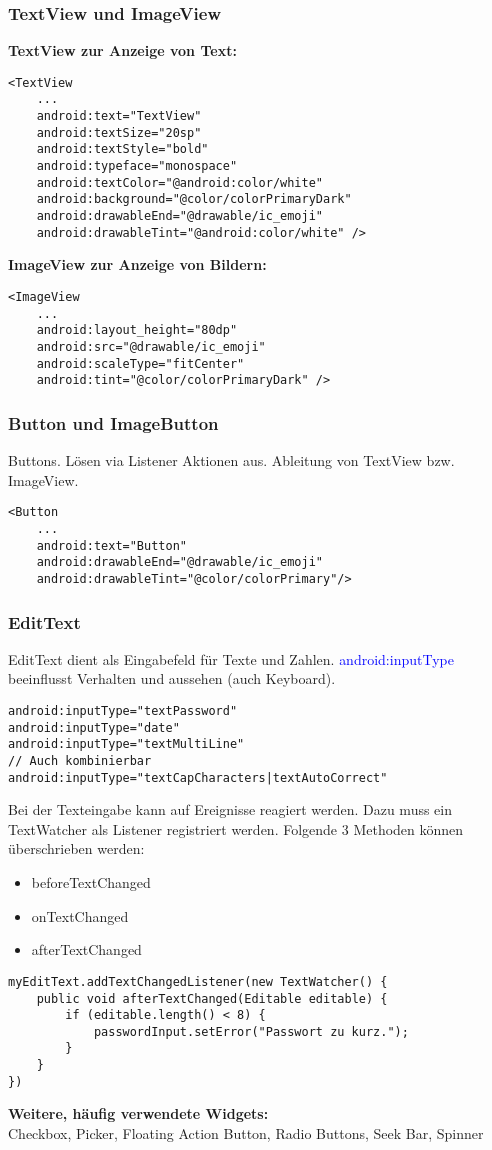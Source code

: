 \subsubsection{TextView und ImageView}
\textbf{TextView zur Anzeige von Text:}
\begin{lstlisting}
<TextView
    ...
    android:text="TextView"
    android:textSize="20sp"
    android:textStyle="bold"
    android:typeface="monospace"
    android:textColor="@android:color/white"
    android:background="@color/colorPrimaryDark"
    android:drawableEnd="@drawable/ic_emoji"
    android:drawableTint="@android:color/white" />
\end{lstlisting}
\textbf{ImageView zur Anzeige von Bildern:}
\begin{lstlisting}
<ImageView
    ...
    android:layout_height="80dp"
    android:src="@drawable/ic_emoji"
    android:scaleType="fitCenter"
    android:tint="@color/colorPrimaryDark" />
\end{lstlisting}
\subsubsection{Button und ImageButton}
Buttons. Lösen via Listener Aktionen aus. Ableitung von TextView bzw. ImageView.
\begin{lstlisting}
<Button
    ...
    android:text="Button"
    android:drawableEnd="@drawable/ic_emoji"
    android:drawableTint="@color/colorPrimary"/>
\end{lstlisting}
\subsubsection{EditText}
EditText dient als Eingabefeld für Texte und Zahlen. \textcolor{blue}{android:inputType} beeinflusst Verhalten und aussehen (auch Keyboard).
\begin{lstlisting}
android:inputType="textPassword"
android:inputType="date"
android:inputType="textMultiLine"
// Auch kombinierbar
android:inputType="textCapCharacters|textAutoCorrect"
\end{lstlisting}
Bei der Texteingabe kann auf Ereignisse reagiert werden. Dazu muss ein TextWatcher als Listener registriert werden. Folgende 3 Methoden können überschrieben werden:
\begin{itemize}[topsep=0pt, leftmargin=4mm]
    \setlength\itemsep{-0.3em}
    \item beforeTextChanged
    \item onTextChanged
    \item afterTextChanged
\end{itemize}
\begin{lstlisting}
myEditText.addTextChangedListener(new TextWatcher() {
    public void afterTextChanged(Editable editable) {
        if (editable.length() < 8) {
            passwordInput.setError("Passwort zu kurz.");
        }
    }
})
\end{lstlisting}
\textbf{Weitere, häufig verwendete Widgets:}\\
Checkbox, Picker, Floating Action Button, Radio Buttons, Seek Bar, Spinner

